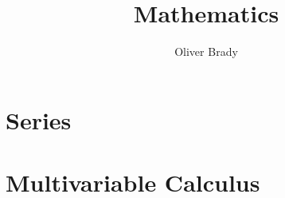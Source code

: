 \documentclass[]{article}
\title{Mathematics}
\author{Oliver Brady}
\begin{document}
\maketitle
\tableofcontents


\section{Series}
\section{Multivariable Calculus}


\end{document}
